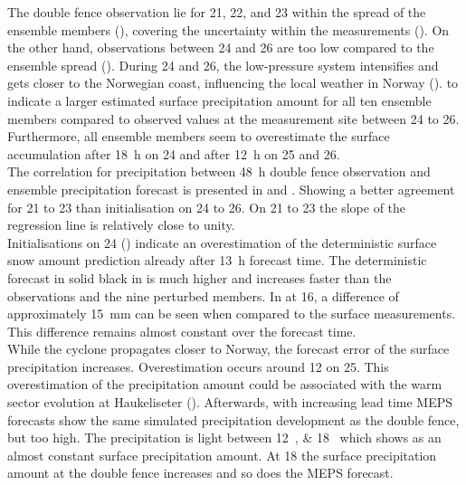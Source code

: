 The double fence observation lie for \num{21}, \num{22}, and \SI{23}{\dec} within the spread of the ensemble members (), covering the uncertainty within the measurements (). On the other hand, observations between \num{24} and \SI{26}{\dec} are too low  compared to the ensemble spread ().
During \num{24} and \SI{26}{\dec}, the low-pressure system intensifies and gets closer to the Norwegian coast, influencing the local weather in Norway ().  to  indicate a larger estimated surface precipitation amount for all ten ensemble members compared to observed values at the measurement site between \num{24} to \SI{26}{\dec}. Furthermore, all ensemble members seem to overestimate the surface accumulation after \SI{18}{\hour} on \SI{24}{\dec} and after \SI{12}{\hour} on \num{25} and \SI{26}{\dec}. 
\\
The correlation for precipitation between \SI{48}{\hour} double fence observation and ensemble precipitation forecast is presented in  and . Showing a better agreement for \num{21} to \SI{23}{\dec} than initialisation on \num{24} to \SI{26}{\dec}. On \num{21} to \SI{23}{\dec} the slope of the regression line is relatively close to unity. 
\\
Initialisations on \SI{24}{\dec} () indicate an overestimation of the deterministic surface snow amount prediction already after \SI{13}{\hour} forecast time. The deterministic forecast in solid black in  is much higher and increases faster than the observations and the nine perturbed members. In  at \SI{16}{\UTC}, a difference of approximately \SI{15}{\mm} can be seen when compared to the surface measurements. This difference remains almost constant over the forecast time. 
\\
While the cyclone propagates closer to Norway, the forecast error of the surface precipitation increases. Overestimation occurs around \SI{12}{\UTC} on \SI{25}{\dec}. This overestimation of the precipitation amount could be associated with the warm sector evolution at Haukeliseter (). Afterwards, with increasing lead time MEPS forecasts show the same simulated precipitation development as the double fence, but too high. The precipitation is light between \SIlist{12;18}{\UTC} which shows as an almost constant surface precipitation amount. At \SI{18}{\UTC} the surface precipitation amount at the double fence increases and so does the MEPS forecast.
